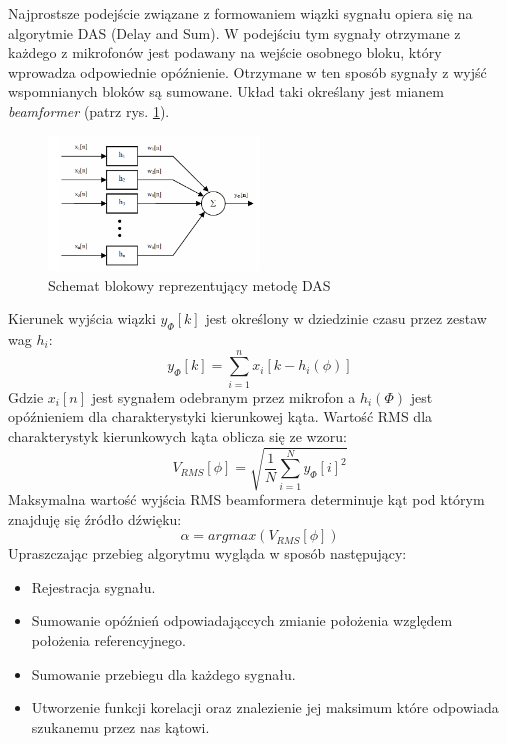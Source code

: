 \documentclass[eng,printmode]{mgr}
\begin{document}
Najprostsze podejście związane z formowaniem wiązki sygnału opiera się na algorytmie DAS (Delay and Sum). W podejściu tym sygnały otrzymane z każdego z mikrofonów jest podawany na wejście osobnego bloku, który wprowadza odpowiednie opóźnienie. Otrzymane w ten sposób sygnały z wyjść wspomnianych bloków są sumowane. Układ taki określany jest mianem {\em beamformer} (patrz rys. \ref{fig-beamformer}).
\begin{figure}[ht]

    \centering

  \includegraphics[width=0.5\textwidth, angle=0]{DAS.png}

    \caption{Schemat blokowy reprezentujący metodę DAS}
 \label{fig-beamformer}
    

\end{figure}
\newline 
Kierunek wyjścia wiązki $y_{\Phi}[k]$ jest określony w dziedzinie czasu przez zestaw wag $h_{i}$:
\begin{equation}
 y_{\Phi}[k] = \sum_{i=1}^n x_{i}[k-h_{i}(\phi)] 
\end{equation}
Gdzie $x_{i}[n]$ jest sygnałem odebranym przez mikrofon a $h_{i}(\Phi)$ jest opóźnieniem dla charakterystyki kierunkowej kąta.
Wartość RMS dla charakterystyk kierunkowych kąta oblicza się ze wzoru:
\begin{equation}
 V_{RMS}[\phi] = \sqrt{\frac{1}{N}\sum_{i=1}^N y_{\Phi}[i]^2 }
\end{equation}
Maksymalna wartość wyjścia RMS beamformera determinuje kąt pod którym znajduję się źródło dźwięku:
\begin{equation}
 \alpha = argmax(V_{RMS}[\phi])
\end{equation}
 Upraszczając przebieg algorytmu wygląda w sposób następujący:
 \begin{itemize}
\item Rejestracja sygnału.
\item Sumowanie opóźnień odpowiadająccych zmianie położenia względem położenia referencyjnego. 
\item Sumowanie przebiegu dla każdego sygnału.
\item Utworzenie funkcji korelacji oraz znalezienie jej maksimum które odpowiada szukanemu przez nas kątowi.
\end{itemize}
\end{document}
